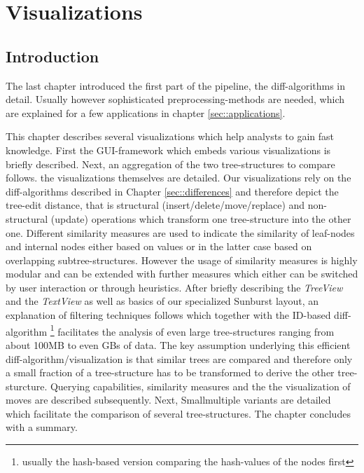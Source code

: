 \section{Visualizations}\label{sec::visualizations}
\subsection{Introduction}
The last chapter introduced the first part of the pipeline, the diff-algorithms in detail. Usually however sophisticated preprocessing-methods are needed, which are explained for a few applications in chapter \ref{sec::applications}.

This chapter describes several visualizations which help analysts to gain fast knowledge. First the GUI-framework which embeds various visualizations is briefly described. Next, an aggregation of the two tree-structures to compare follows.  the visualizations themselves are detailed. Our visualizations rely on the diff-algorithms described in Chapter \ref{sec::differences} and therefore depict the tree-edit distance, that is structural (insert/delete/move/replace) and non-structural (update) operations which transform one tree-structure into the other one. Different similarity measures are used to indicate the similarity of leaf-nodes and internal nodes either based on values or in the latter case based on overlapping subtree-structures. However the usage of similarity measures is highly modular and can be extended with further measures which either can be switched by user interaction or through heuristics. After briefly describing the \emph{TreeView} and the \emph{TextView} as well as basics of our specialized Sunburst layout, an explanation of filtering techniques follows which together with the ID-based diff-algorithm \footnote{usually the hash-based version comparing the hash-values of the nodes first} facilitates the analysis of even large tree-structures ranging from about 100MB to even GBs of data. The key assumption underlying this efficient diff-algorithm/visualization is that similar trees are compared and therefore only a small fraction of a tree-structure has to be transformed to derive the other tree-sturcture. Querying capabilities, similarity measures and the the visualization of moves are described subsequently. Next, Smallmultiple variants are detailed which facilitate the comparison of several tree-structures. The chapter concludes with a summary.

